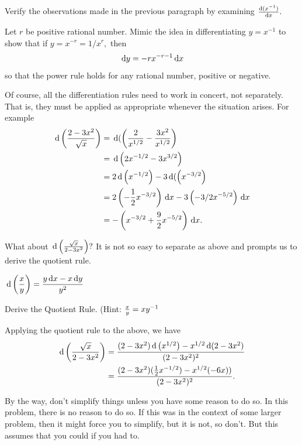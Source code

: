 \begin{embeddedproblem}{}
  Verify the observations made in the previous paragraph by examining $\frac{\text{d}{(x^{-1})}}{\text{d}{x}}.$
\end{embeddedproblem}

 \begin{embeddedproblem}{}
   Let $r$ be positive rational number.  Mimic the idea in differentiating $y=x^{-1}$  to show that if $y=x^{-r}=1/x^r,$ then
 $$
 \thinspace{\rm d}y=-rx^{-r-1} \thinspace{\rm d}x
 $$
 so that the power rule holds for any rational number, positive or negative.
 \end{embeddedproblem}

 Of course, all the differentiation rules need to  work in
 concert, not separately.  That is, they  must be applied as appropriate whenever the situation
 arises.  For example
 \begin{align*}
   \thinspace{\rm d}\left(\frac{2-3x^2}{\sqrt{x}}\right)&=\thinspace{\rm d}(\left(\frac{2}{x^{1/2}}
     -\frac{3x^2}{x^{1/2}}\right)\\
   &=\thinspace{\rm d}\left(2x^{-1/2}-3x^{3/2}\right)\\
   &=2\thinspace{\rm d}\left(x^{-1/2}\right)-3\thinspace{\rm d}(\left(x^{-3/2}\right)\\
   &=2\left(-\frac12 x^{-3/2}\right)\thinspace{\rm d}x-3\left(-3/2 x^{-5/2}\right)\thinspace{\rm d}x\\
   &=-\left(x^{-3/2}+\frac92 x^{-5/2}\right)\thinspace{\rm d}x.
 \end{align*}

 What about $\thinspace{\rm d}\left(\frac{\sqrt{x}}{2-3x^2}\right)?$ It is not so
 easy to separate as above and prompts us to derive the quotient rule.

$\displaystyle \thinspace{\rm d}\left(\frac{x}{y}\right) = \frac{y\thinspace{\rm d}x-x\thinspace{\rm d}y}{y^2}$

\begin{embeddedproblem}{}
  Derive the Quotient Rule. (Hint: $\frac{x}{y}=xy^{-1}$
\end{embeddedproblem}

Applying the quotient rule to the above, we have
\begin{align*}
  \thinspace{\rm d}\left(\frac{\sqrt{x}}{2-3x^2}\right) &=\frac{(2-3x^2)\thinspace{\rm d}\left(x^{1/2}\right)-x^{1/2} \thinspace{\rm d}(2-3x^2)}{(2-3x^2)^2} \\
    &=\frac{(2-3x^2)(\frac12 x^{-1/2} )-x^{1/2} (-6x))}{(2-3x^2 )^2}.
  \end{align*}

  By the way, don't simplify things unless you have some reason to do
  so.  In this problem, there is no reason to do so.  If this was in
  the context of some larger problem, then it might force you to
  simplify, but it is not, so don't.  But this assumes that you could
  if you had to.

